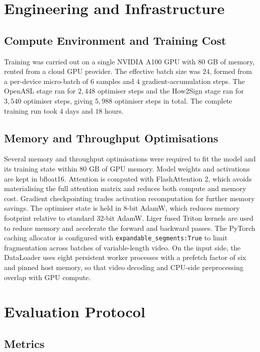 \documentclass{article}
\begin{document}
\section{Engineering and Infrastructure}
\label{sec:engineering}

\subsection{Compute Environment and Training Cost}
\label{sec:eng-compute}

Training was carried out on a single NVIDIA A100 GPU with $80$ GB of memory,
rented from a cloud GPU provider. The effective batch size was $24$, formed
from a per-device micro-batch of $6$ samples and $4$ gradient-accumulation
steps. The OpenASL stage ran for $2{,}448$ optimiser steps and the How2Sign
stage ran for $3{,}540$ optimiser steps, giving $5{,}988$ optimiser steps in
total. The complete training run took $4$ days and $18$ hours.

\subsection{Memory and Throughput Optimisations}
\label{sec:eng-mem}

Several memory and throughput optimisations were required to fit the model
and its training state within $80$ GB of GPU memory. Model weights and
activations are kept in bfloat16. Attention is computed with FlashAttention
2, which avoids materialising the full attention matrix and reduces both
compute and memory cost. Gradient checkpointing trades activation
recomputation for further memory savings. The optimiser state is held in
8-bit AdamW, which reduces memory footprint relative to standard
32-bit AdamW. Liger fused Triton kernels are used to reduce memory and accelerate the
forward and backward passes. The PyTorch caching allocator
is configured with \texttt{expandable\_segments:True} to limit fragmentation
across batches of variable-length video. On the input side, the DataLoader
uses eight persistent worker processes with a prefetch factor of six and
pinned host memory, so that video decoding and CPU-side preprocessing
overlap with GPU compute.


\section{Evaluation Protocol}
\label{sec:evaluation}

\subsection{Metrics}
\label{sec:eval-metrics}
\end{document}
